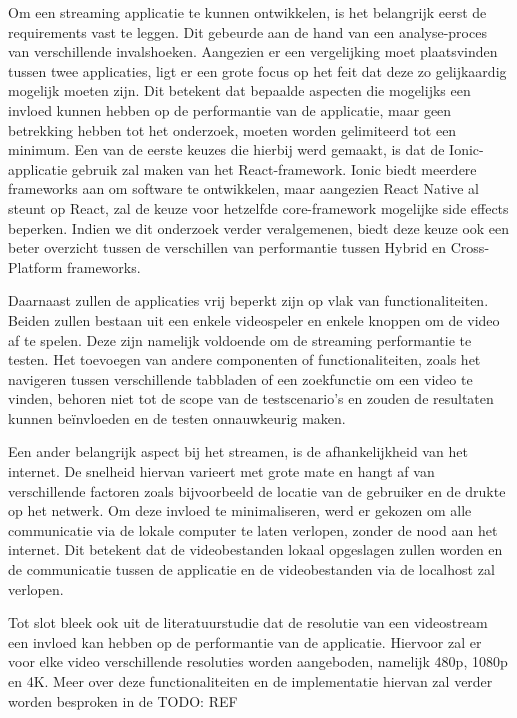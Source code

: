 Om een streaming applicatie te kunnen ontwikkelen, is het belangrijk eerst de requirements vast te leggen. Dit gebeurde aan de hand van een analyse-proces van verschillende invalshoeken. Aangezien er een vergelijking moet plaatsvinden tussen twee applicaties, ligt er een grote focus op het feit dat deze zo gelijkaardig mogelijk moeten zijn. Dit betekent dat bepaalde aspecten die mogelijks een invloed kunnen hebben op de performantie van de applicatie, maar geen betrekking hebben tot het onderzoek, moeten worden gelimiteerd tot een minimum. Een van de eerste keuzes die hierbij werd gemaakt, is dat de Ionic-applicatie gebruik zal maken van het React-framework. Ionic biedt meerdere frameworks aan om software te ontwikkelen, maar aangezien React Native al steunt op React, zal de keuze voor hetzelfde core-framework mogelijke side effects beperken. Indien we dit onderzoek verder veralgemenen, biedt deze keuze ook een beter overzicht tussen de verschillen van performantie tussen Hybrid en Cross-Platform frameworks.

Daarnaast zullen de applicaties vrij beperkt zijn op vlak van functionaliteiten. Beiden zullen bestaan uit een enkele videospeler en enkele knoppen om de video af te spelen. Deze zijn namelijk voldoende om de streaming performantie te testen. Het toevoegen van andere componenten of functionaliteiten, zoals het navigeren tussen verschillende tabbladen of een zoekfunctie om een video te vinden, behoren niet tot de scope van de testscenario's en zouden de resultaten kunnen beïnvloeden en de testen onnauwkeurig maken.

Een ander belangrijk aspect bij het streamen, is de afhankelijkheid van het internet. De snelheid hiervan varieert met grote mate en hangt af van verschillende factoren zoals bijvoorbeeld de locatie van de gebruiker en de drukte op het netwerk. Om deze invloed te minimaliseren, werd er gekozen om alle communicatie via de lokale computer te laten verlopen, zonder de nood aan het internet. Dit betekent dat de videobestanden lokaal opgeslagen zullen worden en de communicatie tussen de applicatie en de videobestanden via de localhost zal verlopen.

Tot slot bleek ook uit de literatuurstudie dat de resolutie van een videostream een invloed kan hebben op de performantie van de applicatie. Hiervoor zal er voor elke video verschillende resoluties worden aangeboden, namelijk 480p, 1080p en 4K. Meer over deze functionaliteiten en de implementatie hiervan zal verder worden besproken in de TODO: REF


